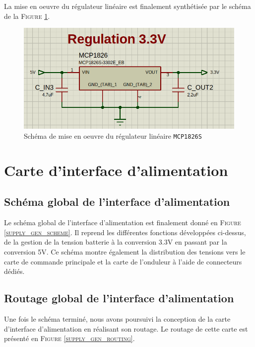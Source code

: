 		La mise en oeuvre du régulateur linéaire est finalement
		synthétisée par le schéma de la \textsc{Figure \ref{LDO_scheme}}.
		
		\begin{figure}[h]
			\begin{center}
				\includegraphics[scale=0.5]{../Illus/LDO_scheme.png}
			\end{center}
			\caption{Schéma de mise en oeuvre du régulateur linéaire \texttt{MCP1826S}}
			\label{LDO_scheme}
		\end{figure}
		
	\newpage
				
	\section{Carte d'interface d'alimentation}
	
		\subsection{Schéma global de l'interface d'alimentation}
		
		Le schéma global de l'interface d'alimentation est finalement
		donné en \textsc{Figure \ref{supply_gen_scheme}}. 
		Il reprend les différentes fonctions développées ci-dessus, 
		de la gestion de la tension batterie à la conversion 3.3V en
		passant par la conversion 5V. Ce schéma montre également
		la distribution des tensions vers le carte de commande 
		principale et la carte de l'onduleur à l'aide de connecteurs
		dédiés.
		
		\subsection{Routage global de l'interface d'alimentation}
		
		Une fois le schéma terminé, nous avons poursuivi la conception
		de la carte d'interface d'alimentation en réalisant son routage.
		Le routage de cette carte est présenté en 
		\textsc{Figure \ref{supply_gen_routing}}.
		
